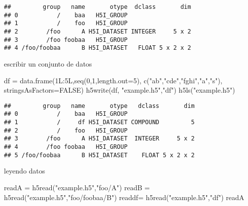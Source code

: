 \documentclass[
]{article}
\newenvironment{Shaded}{\begin{snugshade}}{\end{snugshade}}
\newcommand{\AttributeTok}[1]{\textcolor[rgb]{0.77,0.63,0.00}{#1}}
\newcommand{\ConstantTok}[1]{\textcolor[rgb]{0.00,0.00,0.00}{#1}}
\newcommand{\DecValTok}[1]{\textcolor[rgb]{0.00,0.00,0.81}{#1}}
\newcommand{\FunctionTok}[1]{\textcolor[rgb]{0.00,0.00,0.00}{#1}}
\newcommand{\NormalTok}[1]{#1}
\newcommand{\OtherTok}[1]{\textcolor[rgb]{0.56,0.35,0.01}{#1}}
\newcommand{\SpecialCharTok}[1]{\textcolor[rgb]{0.00,0.00,0.00}{#1}}
\newcommand{\StringTok}[1]{\textcolor[rgb]{0.31,0.60,0.02}{#1}}
\begin{document}
\begin{verbatim}
##         group   name       otype  dclass       dim
## 0           /    baa   H5I_GROUP                  
## 1           /    foo   H5I_GROUP                  
## 2        /foo      A H5I_DATASET INTEGER     5 x 2
## 3        /foo foobaa   H5I_GROUP                  
## 4 /foo/foobaa      B H5I_DATASET   FLOAT 5 x 2 x 2
\end{verbatim}

escribir un conjunto de datos

\begin{Shaded}
\begin{Highlighting}[]
\NormalTok{df }\OtherTok{=} \FunctionTok{data.frame}\NormalTok{(1L}\SpecialCharTok{:}\NormalTok{5L,}\FunctionTok{seq}\NormalTok{(}\DecValTok{0}\NormalTok{,}\DecValTok{1}\NormalTok{,}\AttributeTok{length.out=}\DecValTok{5}\NormalTok{),}
  \FunctionTok{c}\NormalTok{(}\StringTok{"ab"}\NormalTok{,}\StringTok{"cde"}\NormalTok{,}\StringTok{"fghi"}\NormalTok{,}\StringTok{"a"}\NormalTok{,}\StringTok{"s"}\NormalTok{), }\AttributeTok{stringsAsFactors=}\ConstantTok{FALSE}\NormalTok{)}
\FunctionTok{h5write}\NormalTok{(df, }\StringTok{"example.h5"}\NormalTok{,}\StringTok{"df"}\NormalTok{)}
\FunctionTok{h5ls}\NormalTok{(}\StringTok{"example.h5"}\NormalTok{)}
\end{Highlighting}
\end{Shaded}

\begin{verbatim}
##         group   name       otype   dclass       dim
## 0           /    baa   H5I_GROUP                   
## 1           /     df H5I_DATASET COMPOUND         5
## 2           /    foo   H5I_GROUP                   
## 3        /foo      A H5I_DATASET  INTEGER     5 x 2
## 4        /foo foobaa   H5I_GROUP                   
## 5 /foo/foobaa      B H5I_DATASET    FLOAT 5 x 2 x 2
\end{verbatim}

leyendo datos

\begin{Shaded}
\begin{Highlighting}[]
\NormalTok{readA }\OtherTok{=} \FunctionTok{h5read}\NormalTok{(}\StringTok{"example.h5"}\NormalTok{,}\StringTok{"foo/A"}\NormalTok{)}
\NormalTok{readB }\OtherTok{=} \FunctionTok{h5read}\NormalTok{(}\StringTok{"example.h5"}\NormalTok{,}\StringTok{"foo/foobaa/B"}\NormalTok{)}
\NormalTok{readdf}\OtherTok{=} \FunctionTok{h5read}\NormalTok{(}\StringTok{"example.h5"}\NormalTok{,}\StringTok{"df"}\NormalTok{)}
\NormalTok{readA}
\end{Highlighting}
\end{Shaded}
\end{document}
